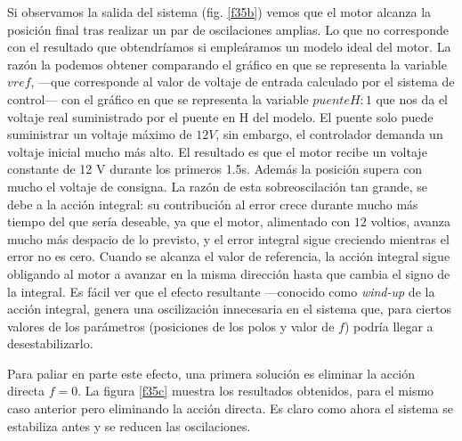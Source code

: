 \documentclass[10pt,a4paper]{report}
\begin{document}
Si observamos la salida del sistema (fig. \ref{f35b}) vemos que el motor alcanza la posición final tras realizar un par de oscilaciones amplias. Lo que no corresponde con el resultado que obtendríamos si empleáramos un modelo ideal del motor. La razón la podemos obtener comparando el gráfico en que se representa la variable $vref$, ---que corresponde al valor de voltaje de entrada calculado por el sistema de control---  con  el gráfico en que se representa la variable $puente H:1$ que nos da el voltaje real suministrado por el puente en H del modelo. El puente solo puede suministrar un voltaje máximo de $12V$, sin embargo, el controlador demanda un voltaje inicial mucho más alto. El resultado es que el motor recibe un voltaje constante de 12 V durante los primeros 1.5s. Además la posición supera con mucho el voltaje de consigna. La razón de esta sobreoscilación tan grande, se debe a la acción integral: su contribución al error crece durante mucho más tiempo del que sería deseable, ya que el motor, alimentado con $12$ voltios, avanza mucho más despacio de lo previsto, y el error integral sigue creciendo mientras el error no es cero. Cuando se alcanza el valor de referencia, la acción integral sigue obligando al motor a avanzar en la misma dirección hasta que cambia el signo de la integral. Es fácil ver que el efecto resultante ---conocido como \emph{wind-up} de la acción integral, genera una oscilización innecesaria en el sistema que, para ciertos valores de los parámetros (posiciones de los polos y valor de $f$) podría llegar a desestabilizarlo.

Para paliar en parte este efecto, una primera solución es eliminar la acción directa $f=0$. La figura \ref{f35c} muestra los resultados obtenidos, para el mismo caso anterior pero eliminando la acción directa. Es claro como ahora el sistema se estabiliza antes y se reducen las oscilaciones.
\end{document}
